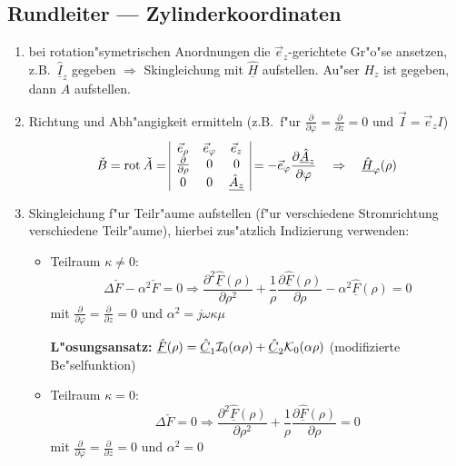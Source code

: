 \subsection{Rundleiter --- Zylinderkoordinaten}
\begin{enumerate}
\item bei rotation"symetrischen Anordnungen die $\vec{e}_z$-gerichtete Gr"o"se
      ansetzen, z.B.\ $\underline{\hat{I}}_z$ gegeben $\Rightarrow$ Skingleichung
      mit $\underline{\hat{H}}$ aufstellen. Au"ser $H_z$ ist gegeben, dann $A$
      aufstellen.
\item Richtung und Abh"angigkeit ermitteln (z.B.\ f"ur $\frac{\partial}{\partial
      \varphi} = \frac{\partial}{\partial z}=0$ und $\vec{I}=\vec{e}_z I$)
      $$\check{B}={\rm rot \:} \check{A} =
      \begin{array}{|ccc|}\vec{e}_{\rho}&\vec{e}_{\varphi}&\vec{e}_z\\
      \frac{\partial}{\partial \rho}&0&0\\0&0&\underline{\hat{A}_z}\\ \end{array} =
      -\vec{e}_{\varphi}\frac{\partial \underline{\hat{A}}_z}{\partial \varphi} \quad
      \Rightarrow\quad \underline{\hat{H}}_{\varphi}(\rho)$$
\item Skingleichung f"ur Teilr"aume aufstellen (f"ur verschiedene Stromrichtung
      verschiedene Teilr"aume), hierbei zus"atzlich Indizierung verwenden:
   \begin{itemize}
   \item Teilraum $\kappa \not= 0$:
         $$\Delta \check{F} - \alpha^2 \check{F} =0 \Rightarrow \frac{\partial^2
         \underline{\hat{F}}(\rho)}{\partial \rho^2}+\frac{1}{\rho}\frac{\partial
         \underline{\hat{F}}(\rho)}{\partial \rho}
         -\alpha^2 \underline{\hat{F}}(\rho) =0$$
         mit $\frac{\partial}{\partial \varphi}=
         \frac{\partial}{\partial z}=0$ und $\alpha^2 =j\omega \kappa \mu$

         {\bf L"osungsansatz:} $\underline{\hat{F}}(\rho)=\underline{\hat{C}}_1{\cal I}_0
         (\alpha\rho)+\underline{\hat{C}}_2 {\cal K}_0(\alpha \rho)$
         (modifizierte Be"selfunktion)

   \item Teilraum $\kappa = 0$:
         $$\Delta \check{F} =0 \Rightarrow \frac{\partial^2 \underline{\hat{F}}(\rho)}{
         \partial \rho^2}+\frac{1}{\rho}\frac{\partial \underline{\hat{F}}(\rho)}{
         \partial \rho}=0$$ mit $\frac{\partial}{\partial \varphi}=
         \frac{\partial}{\partial z}=0$ und $\alpha^2 =0$


\end{itemize}
\end{enumerate}
